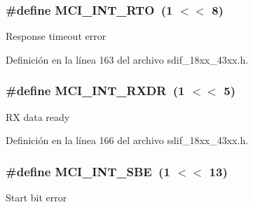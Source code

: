 \subsubsection[{\texorpdfstring{M\+C\+I\+\_\+\+I\+N\+T\+\_\+\+R\+TO}{MCI_INT_RTO}}]{\setlength{\rightskip}{0pt plus 5cm}\#define M\+C\+I\+\_\+\+I\+N\+T\+\_\+\+R\+TO~(1 $<$$<$ 8)}\hypertarget{group___s_d_i_f__18_x_x__43_x_x_gaf3b31f8bad5c195a9d967f0ac1554d96}{}\label{group___s_d_i_f__18_x_x__43_x_x_gaf3b31f8bad5c195a9d967f0ac1554d96}
Response timeout error 

Definición en la línea 163 del archivo sdif\+\_\+18xx\+\_\+43xx.\+h.

\subsubsection[{\texorpdfstring{M\+C\+I\+\_\+\+I\+N\+T\+\_\+\+R\+X\+DR}{MCI_INT_RXDR}}]{\setlength{\rightskip}{0pt plus 5cm}\#define M\+C\+I\+\_\+\+I\+N\+T\+\_\+\+R\+X\+DR~(1 $<$$<$ 5)}\hypertarget{group___s_d_i_f__18_x_x__43_x_x_ga813dbbaf92671d2d86a2af31f057422c}{}\label{group___s_d_i_f__18_x_x__43_x_x_ga813dbbaf92671d2d86a2af31f057422c}
RX data ready 

Definición en la línea 166 del archivo sdif\+\_\+18xx\+\_\+43xx.\+h.

\subsubsection[{\texorpdfstring{M\+C\+I\+\_\+\+I\+N\+T\+\_\+\+S\+BE}{MCI_INT_SBE}}]{\setlength{\rightskip}{0pt plus 5cm}\#define M\+C\+I\+\_\+\+I\+N\+T\+\_\+\+S\+BE~(1 $<$$<$ 13)}\hypertarget{group___s_d_i_f__18_x_x__43_x_x_gacff300d16826c691118a351ac88295c5}{}\label{group___s_d_i_f__18_x_x__43_x_x_gacff300d16826c691118a351ac88295c5}
Start bit error 

